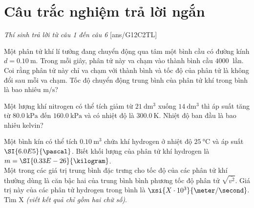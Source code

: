 \section{Câu trắc nghiệm trả lời ngắn} \textit{Thí sinh trả lời từ câu 1 đến câu 6}
\setcounter{ex}{0}
[ans/G12C2TL]
\begin{ex}
	Một phân tử khí lí tưởng đang chuyển động qua tâm một bình cầu có đường kính $d=\SI{0.10}{\meter}$. Trong mỗi giây, phân tử này va chạm vào thành bình cầu $\SI{4000}{}$ lần. Coi rằng phân tử này chỉ va chạm với thành bình và tốc độ của phân tử là không đổi sau mỗi va chạm. Tốc độ chuyển động trung bình của phân tử khí trong bình là bao nhiêu $\si{\meter/\second}$?
\end{ex}
\begin{ex}
	Một lượng khí nitrogen có thể tích giảm từ $\SI{21}{\deci\meter^3}$ xuống $\SI{14}{\deci\meter^3}$ thì áp suất tăng  từ $\SI{80.0}{\kilo\pascal}$ đến $\SI{160.0}{\kilo\pascal}$ và có nhiệt độ là $\SI{300.0}{\kelvin}$. Nhiệt độ ban đầu là bao nhiêu kelvin?
\end{ex}
\begin{ex}
Một bình kín có thể tích $\SI{0.10}{\meter^3}$ chứa khí hydrogen ở nhiệt độ $\SI{25}{\celsius}$ và áp suất $\SI{6.0E5}{\pascal}$. Biết khối lượng của phân tử khí hydrogen là $m=\SI{0.33E-26}{\kilogram}$.\\ Một trong các giá trị trung bình đặc trưng cho tốc độ của các phân tử khí thường dùng là căn bậc hai của trung bình bình phương tốc độ phân tử $\sqrt{\overline{v^2}}$. Giá trị này của các phân tử hydrogen trong bình là $\xsi{X\cdot 10^3}{\meter/\second}$. Tìm X \textit{(viết kết quả chỉ gồm hai chữ số)}.
\end{ex}

